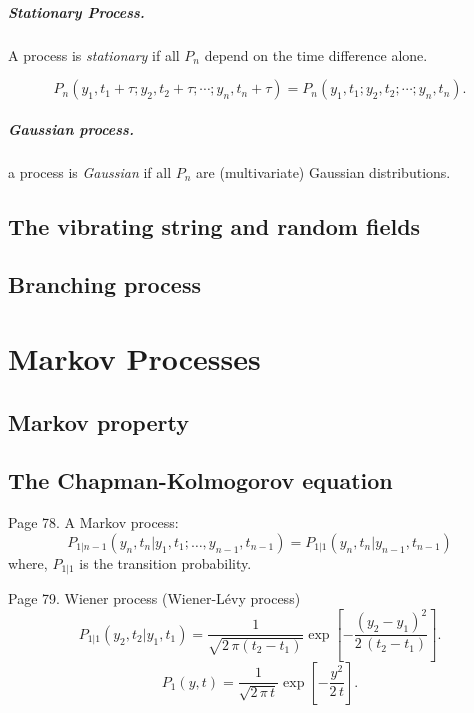 \documentclass{book}
\numberwithin{equation}{section}
\theoremstyle{plain}
\theoremstyle{definition}
\theoremstyle{remark}
\begin{document}
\paragraph{Stationary Process.}

A process is \emph{stationary} if all $P_n$ depend on the time difference alone.

$$
P_n(y_1, t_1 + \tau; y_2, t_2 + \tau; \cdots; y_n, t_n + \tau)
=
P_n(y_1, t_1; y_2, t_2; \cdots; y_n, t_n).
$$


\paragraph{Gaussian process.}

a process is \emph{Gaussian} if all $P_n$ are
(multivariate) Gaussian distributions.


\section{The vibrating string and random fields}

\section{Branching process}


\chapter{Markov Processes}


\section{Markov property}

\section{The Chapman-Kolmogorov equation}

Page 78.
A Markov process:
$$
P_{1|n-1}(y_n, t_n| y_1, t_1; \dots, y_{n-1}, t_{n-1})
=
P_{1|1}(y_n, t_n|y_{n-1},t_{n-1})
$$
where, $P_{1|1}$ is the transition probability.

Page 79.
Wiener process (Wiener-L\'evy process)
\begin{equation}
P_{1|1}(y_2, t_2|y_1, t_1)
=
\frac{1}{\sqrt{2\,\pi(t_2 - t_1)}}
\exp\left[
  -\frac{ (y_2 - y_1)^2 } { 2 \, (t_2 - t_1) }
\right].
\tag{2.4}
\end{equation}
%
\begin{equation}
P_1(y, t)
=
\frac{1}{\sqrt{2\,\pi\,t}}
\exp\left[
  -\frac{ y^2 } { 2 \, t }
\right].
\tag{2.5}
\end{equation}
\end{document}

